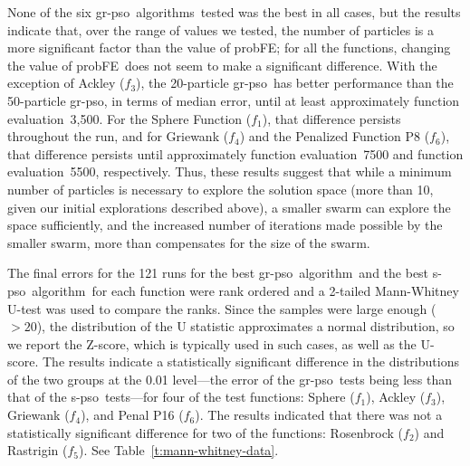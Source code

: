 \documentclass[a4paper,twoside]{article}
\newcommand{\fe}{function evaluation}
\newcommand{\pfe}{{probFE}}
\newcommand{\spso}{{\sc s-pso}}
\newcommand{\cfe}{{\sc gr-pso}}
\newcommand{\alg}{algorithm}
\newcommand{\algs}{algorithms}
\begin{document}
None of the six \cfe\ \algs\ tested was the best in all cases, but the results indicate that, over the range of values we tested, the number of particles is a more significant factor than the value of \pfe; for all the functions, changing  the value of \pfe\ does not seem to make a significant difference.  With the exception of  Ackley  ($f_3$), the 20-particle \cfe\ has better performance than the 50-particle \cfe, in terms of median error, until at least approximately \fe\ 3,500.  For the Sphere Function ($f_1$), that difference persists throughout the run, and for  Griewank  ($f_4$) and the Penalized Function P8 ($f_6$), that difference persists until approximately \fe\ 7500 and \fe\ 5500, respectively.  Thus, these results suggest that while a minimum number of particles is necessary to explore the solution space (more than 10, given our initial explorations described above), a smaller swarm can explore the space sufficiently, and the increased number of iterations made possible by the smaller swarm, more than compensates for the size of the swarm.

The final errors for the 121 runs for the best \cfe\ \alg\ and the best \spso\ \alg\ for each function were rank ordered and a 2-tailed Mann-Whitney U-test was used to compare the ranks. Since the samples were large enough ($> 20$), the distribution of the U statistic approximates a normal distribution, so we report the Z-score, which is typically used in such cases, as well as the U-score. The results indicate a statistically significant difference in the distributions of the two groups at the 0.01 level---the error of the \cfe\ tests being less than that of the \spso\ tests---for four of the test functions:  Sphere ($f_1$), Ackley ($f_3$), Griewank ($f_4$), and Penal P16 ($f_6$).
The results indicated that there was not a statistically significant difference for two of the functions: Rosenbrock ($f_2$) and Rastrigin ($f_5$).
See Table~\ref{t:mann-whitney-data}.
\end{document}
